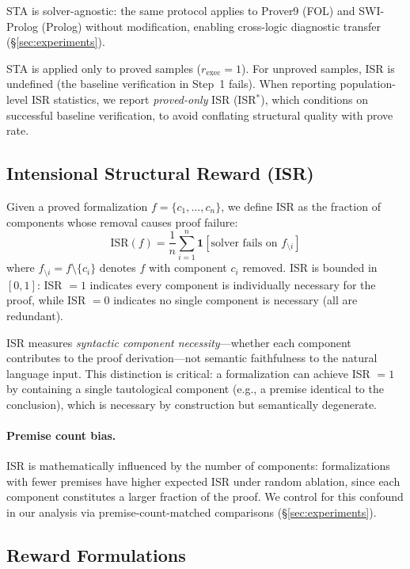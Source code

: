 STA is solver-agnostic: the same protocol applies to Prover9 (FOL) and SWI-Prolog (Prolog) without modification, enabling cross-logic diagnostic transfer (\S\ref{sec:experiments}).

STA is applied only to proved samples ($r_{\text{exec}} = 1$). For unproved samples, ISR is undefined (the baseline verification in Step~1 fails). When reporting population-level ISR statistics, we report \emph{proved-only} ISR (ISR$^*$), which conditions on successful baseline verification, to avoid conflating structural quality with prove rate.

\subsection{Intensional Structural Reward (ISR)}
\label{ssec:isr}

Given a proved formalization $f = \{c_1, \ldots, c_n\}$, we define ISR as the fraction of components whose removal causes proof failure:
\begin{equation}
    \text{ISR}(f) = \frac{1}{n} \sum_{i=1}^{n} \mathbf{1}\left[\text{solver fails on } f_{\setminus i}\right]
    \label{eq:isr}
\end{equation}
where $f_{\setminus i} = f \setminus \{c_i\}$ denotes $f$ with component $c_i$ removed. ISR is bounded in $[0, 1]$: ISR $= 1$ indicates every component is individually necessary for the proof, while ISR $= 0$ indicates no single component is necessary (all are redundant).

ISR measures \emph{syntactic component necessity}---whether each component contributes to the proof derivation---not semantic faithfulness to the natural language input. This distinction is critical: a formalization can achieve ISR $= 1$ by containing a single tautological component (e.g., a premise identical to the conclusion), which is necessary by construction but semantically degenerate.

\paragraph{Premise count bias.} ISR is mathematically influenced by the number of components: formalizations with fewer premises have higher expected ISR under random ablation, since each component constitutes a larger fraction of the proof. We control for this confound in our analysis via premise-count-matched comparisons (\S\ref{sec:experiments}).

\subsection{Reward Formulations}
\label{ssec:reward}

